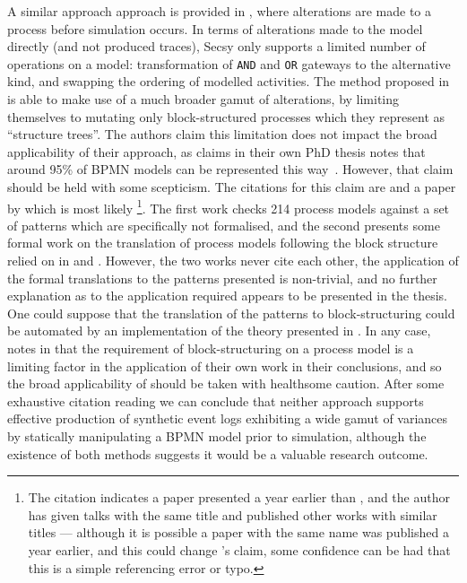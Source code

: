 A similar approach approach is provided in \cite{pourmasoumi2015business}, where
alterations are made to a process before simulation occurs. In terms of
alterations made to the model directly (and not produced traces), Secsy only
supports a limited number of operations on a model: transformation of
\texttt{AND} and \texttt{OR} gateways to the alternative kind, and swapping the
ordering of modelled activities. The method proposed in
\cite{pourmasoumi2015business} is able to make use of a much broader gamut of
alterations, by limiting themselves to mutating only block-structured processes
which they represent as ``structure trees''. The authors claim this limitation
does not impact the broad applicability of their approach, as
\citeauthor{chenthesis} claims in their own PhD thesis notes that around 95\% of
BPMN models can be represented this way~\cite{chenthesis}. However, that claim
should be held with some scepticism. The citations for this claim are
\cite{Thom2009ActivityPI} and a paper by \citeauthor{polyvyanny2010structuring}
which is most likely \cite{polyvyanny2010structuring}\footnote{The citation
indicates a paper presented a year earlier than
\cite{polyvyanny2010structuring}, and the author has given talks with the same
title and published other works with similar titles --- although it is possible
a paper with the same name was published a year earlier, and this could change
\citeauthor{chenthesis}'s claim, some confidence can be had that this is a
simple referencing error or typo.}. The first work checks 214 process models
against a set of patterns which are specifically not formalised, and the second
presents some formal work on the translation of process models following the
block structure relied on in \cite{pourmasoumi2015business} and
\cite{chenthesis}. However, the two works never cite each other, the application
of the formal translations to the patterns presented is non-trivial, and no
further explanation as to the application required appears to be presented in
the thesis. One could suppose that the translation of the patterns to
block-structuring could be automated by an implementation of the theory
presented in \cite{polyvyanny2010structuring}. In any case,
\citeauthor{chenthesis} notes in \cite{chenthesis} that the requirement of
block-structuring on a process model is a limiting factor in the application of
their own work in their conclusions, and so the broad applicability of
\cite{pourmasoumi2015business} should be taken with healthsome caution. After
some exhaustive citation reading we can conclude that neither approach supports
effective production of synthetic event logs exhibiting a wide gamut of
variances by statically manipulating a BPMN model prior to simulation, although
the existence of both methods suggests it would be a valuable research outcome.

